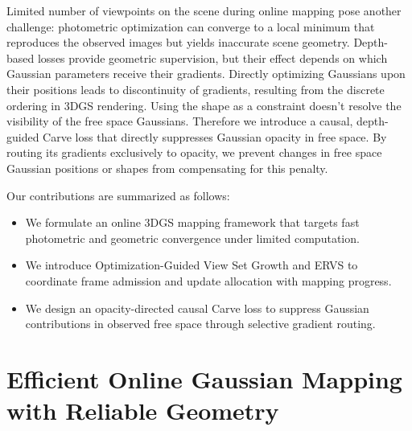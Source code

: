 \documentclass[nth=33]{humantech}
\begin{document}
 Limited number of viewpoints on the scene during online mapping pose another challenge: photometric optimization can converge to a local minimum that reproduces the observed images but yields inaccurate scene geometry.
Depth-based losses provide geometric supervision, but their effect depends on which Gaussian parameters receive their gradients. Directly optimizing Gaussians upon their positions leads to discontinuity of gradients, resulting from the discrete ordering in 3DGS rendering. Using the shape as a constraint doesn't resolve the visibility of the free space Gaussians.
Therefore we introduce a causal, depth-guided Carve loss that directly suppresses Gaussian opacity in free space.
By routing its gradients exclusively to opacity, we prevent changes in free space Gaussian positions or shapes from compensating for this penalty.

Our contributions are summarized as follows:
\begin{itemize}
    \item We formulate an online 3DGS mapping framework that targets fast photometric and geometric convergence under limited computation.
    \item We introduce Optimization-Guided View Set Growth and ERVS to coordinate frame admission and update allocation with mapping progress.
    \item We design an opacity-directed causal Carve loss to suppress Gaussian contributions in observed free space through selective gradient routing.
\end{itemize}

\section{Efficient Online Gaussian Mapping with Reliable Geometry}
\label{sec:method}
\end{document}
